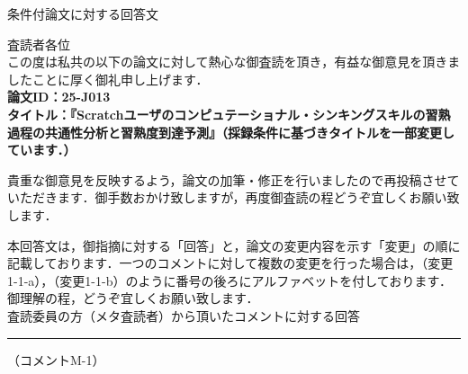 \documentclass{jarticle} %
\def\restitle{条件付論文に対する回答文}
\def\section#1{ \vspace{3pc} {\large \gt #1} \vspace{1pc} \hrule }
\def\subsection#1{ \vspace{1pc} {\gt #1} }
\begin{document}
{\Large \gt \restitle}

\vspace{3pc}

査読者各位\\


この度は私共の以下の論文に対して熱心な御査読を頂き，有益な御意見を頂きましたことに厚く御礼申し上げます．\\
\textbf{論文ID：25-J013}\\
\textbf{タイトル：『Scratchユーザのコンピュテーショナル・シンキングスキルの習熟過程の共通性分析と習熟度到達予測』（採録条件に基づきタイトルを一部変更しています．）}

貴重な御意見を反映するよう，論文の加筆・修正を行いましたので再投稿させていただきます．御手数おかけ致しますが，再度御査読の程どうぞ宜しくお願い致します．	

本回答文は，御指摘に対する「回答」と，論文の変更内容を示す「変更」の順に記載しております．一つのコメントに対して複数の変更を行った場合は，（変更1-1-a），（変更1-1-b）のように番号の後ろにアルファベットを付しております．御理解の程，どうぞ宜しくお願い致します．\\


\section{査読委員の方（メタ査読者）から頂いたコメントに対する回答}

\subsection{（コメントM-1）}
\end{document}
